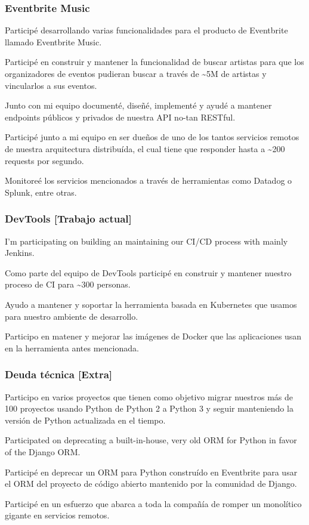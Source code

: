 \documentclass{article}
\begin{document}
\subsubsection{Eventbrite Music}
  \begin{description}
    \item Participé desarrollando varias funcionalidades para el producto de Eventbrite llamado Eventbrite Music.
    \item Participé en construir y mantener la funcionalidad de buscar artistas para que los organizadores de eventos pudieran buscar a través de \textasciitilde5M de artistas y vincularlos a sus eventos.
    \item Junto con mi equipo documenté, diseñé, implementé y ayudé a mantener endpoints públicos y privados de nuestra API no-tan RESTful.
    \item Participé junto a mi equipo en ser dueños de uno de los tantos servicios remotos de nuestra arquitectura distribuída, el cual tiene que responder hasta a \textasciitilde200 requests por segundo.
    \item Monitoreé los servicios mencionados a través de herramientas como Datadog o Splunk, entre otras.
  \end{description}
\subsubsection{DevTools [Trabajo actual]}
  \begin{description}
    \item I'm participating on building an maintaining our CI/CD process with mainly Jenkins.
    \item Como parte del equipo de DevTools participé en construir y mantener nuestro proceso de CI para \textasciitilde300 personas.
    \item Ayudo a mantener y soportar la herramienta basada en Kubernetes que usamos para nuestro ambiente de desarrollo.
    \item Participo en matener y mejorar las imágenes de Docker que las aplicaciones usan en la herramienta antes mencionada.
  \end{description}
\subsubsection{Deuda técnica [Extra]}
  \begin{description}
    \item Participo en varios proyectos que tienen como objetivo migrar nuestros más de 100 proyectos usando Python de Python 2 a Python 3 y seguir manteniendo la versión de Python actualizada en el tiempo.
    \item Participated on deprecating a built-in-house, very old ORM for Python in favor of the Django ORM.
    \item Participé en deprecar un ORM para Python construído en Eventbrite para usar el ORM del proyecto de código abierto mantenido por la comunidad de Django.
    \item Participé en un esfuerzo que abarca a toda la compañía de romper un monolítico gigante en servicios remotos.
  \end{description}
\end{document}
